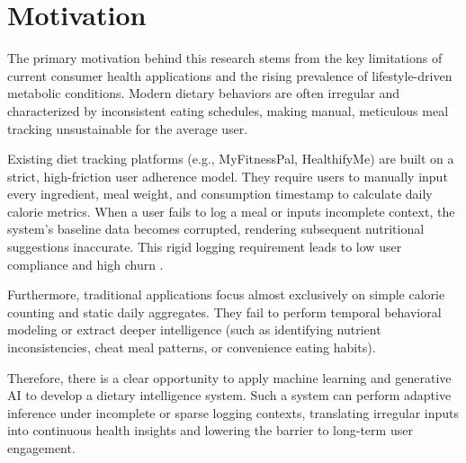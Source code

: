 \documentclass[12pt,a4paper,oneside]{report}
\begin{document}
\section{Motivation}
The primary motivation behind this research stems from the key limitations of current consumer health applications and the rising prevalence of lifestyle-driven metabolic conditions. Modern dietary behaviors are often irregular and characterized by inconsistent eating schedules, making manual, meticulous meal tracking unsustainable for the average user.

Existing diet tracking platforms (e.g., MyFitnessPal, HealthifyMe) are built on a strict, high-friction user adherence model. They require users to manually input every ingredient, meal weight, and consumption timestamp to calculate daily calorie metrics. When a user fails to log a meal or inputs incomplete context, the system's baseline data becomes corrupted, rendering subsequent nutritional suggestions inaccurate. This rigid logging requirement leads to low user compliance and high churn \cite{carter2013adherence}.

Furthermore, traditional applications focus almost exclusively on simple calorie counting and static daily aggregates. They fail to perform temporal behavioral modeling or extract deeper intelligence (such as identifying nutrient inconsistencies, cheat meal patterns, or convenience eating habits).

Therefore, there is a clear opportunity to apply machine learning and generative AI to develop a dietary intelligence system. Such a system can perform adaptive inference under incomplete or sparse logging contexts, translating irregular inputs into continuous health insights and lowering the barrier to long-term user engagement.
\end{document}
